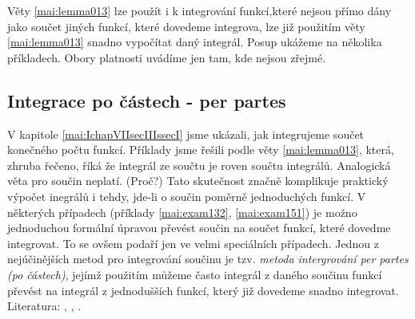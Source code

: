       Věty \ref{mai:lemma013} lze použít i k integrování funkcí,které nejsou přímo dány jako součet
      jiných funkcí, které dovedeme integrova, lze již použitím věty \ref{mai:lemma013} snadno
      vypočítat daný integrál. Posup ukážeme na několika příkladech. Obory platnosti uvádíme jen
      tam, kde nejsou zřejmé. 
      
      
      
      
      
      
      
      
      
      
      
      
      
    \newpage
    \subsection{Integrace po částech - per partes}\label{mai:IchapVIIsecIIIssecII} 
      V kapitole \ref{mai:IchapVIIsecIIIssecI} jsme ukázali, jak integrujeme součet konečného počtu
      funkcí. Příklady jsme řešili podle věty \ref{mai:lemma013}, která, zhruba řečeno, říká že
      integrál ze součtu je roven součtu integrálů. Analogická věta pro součin neplatí. (Proč?) Tato
      skutečnost značně komplikuje praktický výpočet inegrálů i tehdy, jde-li o součin poměrně
      jednoduchých funkcí. V některých případech (příklady \ref{mai:exam132}, \ref{mai:exam151}) je
      možno jednoduchou formální úpravou převést součin na součet funkcí, které dovedme integrovat.
      To se ovšem podaří jen ve velmi speciálních případech. Jednou z nejúčinějších metod pro
      integrování součinu je tzv. \emph{metoda intergrování per partes (po částech)}, jejímž
      použitím můžeme často integrál z daného součinu funkcí převést na integrál z jednodušších
      funkcí, který již dovedeme snadno integrovat. Literatura: \cite[p.~137]{Musilova2009MA1},
      \cite[s.~33]{Knichal}, \cite[s.~20]{Hoskova}.
      
